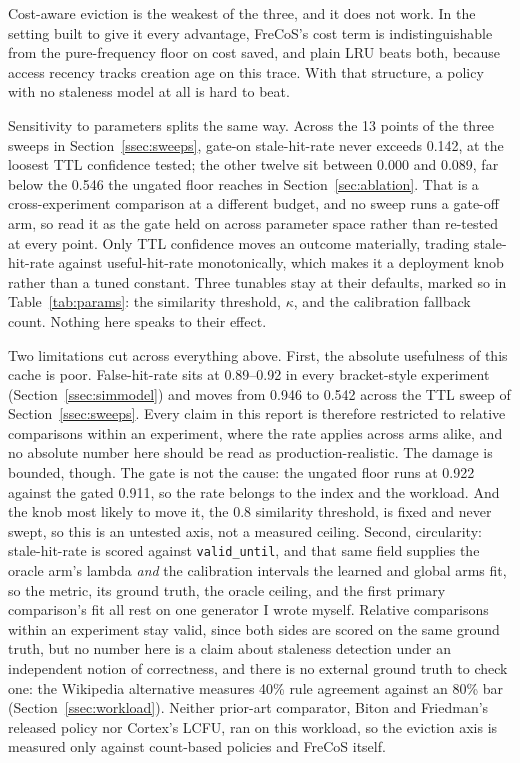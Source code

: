 \documentclass[10pt]{article}
\begin{document}
Cost-aware eviction is the weakest of the three, and it does not work. In the setting built to give it every
advantage, FreCoS's cost term is indistinguishable from the pure-frequency floor on cost
saved, and plain LRU beats both, because access recency tracks creation age on this trace.
With that structure, a policy with no staleness model at all is hard to beat.

Sensitivity to parameters splits the same way. Across the 13 points of the three sweeps in
Section~\ref{ssec:sweeps}, gate-on stale-hit-rate never exceeds 0.142, at the loosest TTL
confidence tested; the other twelve sit between 0.000 and 0.089, far below the 0.546 the
ungated floor reaches in Section~\ref{sec:ablation}. That is a cross-experiment comparison at
a different budget, and no sweep runs a gate-off arm, so read it as the gate held on across
parameter space rather than re-tested at every point. Only TTL confidence moves an outcome
materially, trading stale-hit-rate against useful-hit-rate monotonically, which makes it a
deployment knob rather than a tuned constant. Three tunables stay at their defaults, marked so
in Table~\ref{tab:params}: the similarity threshold, $\kappa$, and the calibration fallback
count. Nothing here speaks to their effect.

Two limitations cut across everything above. First, the absolute usefulness of this cache is
poor. False-hit-rate sits at 0.89--0.92 in every bracket-style experiment
(Section~\ref{ssec:simmodel}) and moves from 0.946 to 0.542 across the TTL sweep of
Section~\ref{ssec:sweeps}. Every claim in this report is therefore restricted to relative
comparisons within an experiment, where the rate applies across arms alike, and no absolute
number here should be read as production-realistic. The damage is bounded, though. The gate is not
the cause: the ungated floor runs at 0.922 against the gated 0.911,
so the rate belongs to the index and the workload. And the knob most likely to move it, the 0.8
similarity threshold, is fixed and never swept, so this is an untested axis, not a measured
ceiling. Second,
circularity: stale-hit-rate is scored against \texttt{valid\_until}, and that same field
supplies the oracle arm's lambda \emph{and} the calibration intervals the learned and global
arms fit, so the metric, its ground truth, the oracle ceiling, and the first primary
comparison's fit all rest on one generator I wrote myself.
Relative comparisons within an experiment stay valid, since both sides are scored on the same
ground truth, but no number here is a claim about staleness detection under an independent
notion of correctness, and there is no external ground truth to check one: the Wikipedia
alternative measures 40\% rule agreement against an 80\% bar (Section~\ref{ssec:workload}).
Neither prior-art comparator, Biton and Friedman's released policy nor Cortex's LCFU, ran on
this workload, so the eviction axis is measured only against count-based policies and FreCoS
itself.
\end{document}

